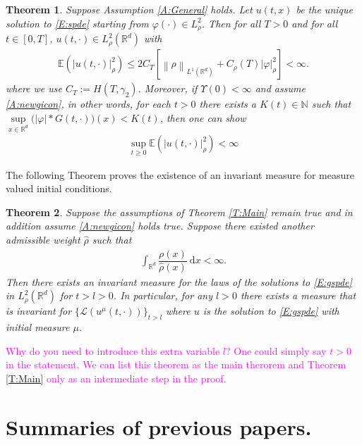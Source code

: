 \documentclass[a4paper,11pt]{article}%
\numberwithin{equation}{section}
\theoremstyle{plain}
\newtheorem{theorem}{Theorem}[section]
\theoremstyle{definition}
\newcommand{\R}{\mathbb{R}}
\newcommand{\E}{\mathbb{E}}
\newcommand{\Norm}[1]{\left\|  #1   \right\|}
\newcommand{\ud}{\ensuremath{ \mathrm{d} }}
\begin{document}
\begin{theorem}
	\label{T:Moment}
	Suppose Assumption \ref{A:General} holds.
	Let $u(t,x)$ be the unique solution to \eqref{E:spde} starting from  $\varphi(\cdot) \in L^2_\rho$. Then for all $T>0$ and for all $t \in [0,T]$, $u(t,\cdot)\in L^2_\rho(\R^d)$ with
	\begin{align}
	\label{E:uNormRho}
	\E\left(| u(t,\cdot)|_\rho^2\right)
	\le  2 C_T \left[ \Norm{\rho}_{L^1(\R^d)} + C_\rho(T) |\varphi|_{\rho}^2 \right]<\infty.
	\end{align}
	where we use $C_T:= H(T,\gamma_2)$. Moreover, if $\Upsilon(0)<\infty$ and assume \eqref{A:newgicon}, in other words, for each $t>0$ there exists a $K(t) \in \mathbb N$ such that $\sup\limits_{x\in \R^d}\big(|\varphi|*G(t,\cdot)\big)(x) < K(t)$, then one can show
	\begin{align*}
	\sup_{t\ge 0}\E\left(|u(t,\cdot)|_\rho^2\right) < \infty
	\end{align*}
\end{theorem}

The following Theorem proves the existence of an invariant measure for measure valued initial conditions.

\begin{theorem}
	\label{T:Main2}
	Suppose the assumptions of Theorem \ref{T:Main} remain true and in addition assume \eqref{A:newgicon} holds true. Suppose there existed
	another admissible weight $\hat{\rho}$ such that
	\begin{align*}
	\int_{\R^d}\dfrac{\rho(x)}{\hat\rho(x)}\: \ud x < \infty.
	\end{align*}
	Then there exists an invariant measure for the laws of the solutions to
	\eqref{E:gspde} in $L^2_\rho(\R^d)$ for $t>l>0$. In particular, for any $l>0$ there exists a measure that is
	invariant for $\{\mathscr L (u^\mu(t,\cdot))\}_{t>l}$ where $u$ is the solution to \eqref{E:gspde} with
	initial measure $\mu$.
\end{theorem}

\textcolor{magenta}{Why do you need to introduce this extra variable $l$? One could simply say  $t>0$ in the statement.
We can list this theorem as the main therorem and Theorem \ref{T:Main} only as an intermediate step
in the proof.}


\section{Summaries of previous papers.}
\end{document}
